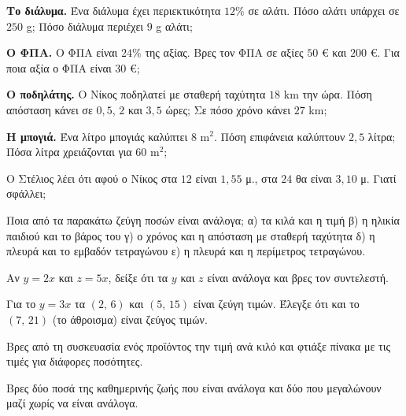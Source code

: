 \ex \textbf{Το διάλυμα.} Ένα διάλυμα έχει περιεκτικότητα $12\%$ σε αλάτι. Πόσο αλάτι υπάρχει σε $250$ g; Πόσο διάλυμα περιέχει $9$ g αλάτι;

\ex \textbf{Ο ΦΠΑ.} Ο ΦΠΑ είναι $24\%$ της αξίας. Βρες τον ΦΠΑ σε αξίες $50$ € και $200$ €. Για ποια αξία ο ΦΠΑ είναι $30$ €;

\ex \textbf{Ο ποδηλάτης.} Ο Νίκος ποδηλατεί με σταθερή ταχύτητα $18$ km την ώρα. Πόση απόσταση κάνει σε $0{,}5$, $2$ και $3{,}5$ ώρες; Σε πόσο χρόνο κάνει $27$ km;

\ex \textbf{Η μπογιά.} Ένα λίτρο μπογιάς καλύπτει $8$ m$^2$. Πόση επιφάνεια καλύπτουν $2{,}5$ λίτρα; Πόσα λίτρα χρειάζονται για $60$ m$^2$;


\ex Ο Στέλιος λέει ότι αφού ο Νίκος στα $12$ είναι $1{,}55$ μ., στα $24$ θα είναι $3{,}10$ μ. Γιατί σφάλλει;

\ex Ποια από τα παρακάτω ζεύγη ποσών είναι ανάλογα; α) τα κιλά και η τιμή \quad β) η ηλικία παιδιού και το βάρος του \quad γ) ο χρόνος και η απόσταση με σταθερή ταχύτητα \quad δ) η πλευρά και το εμβαδόν τετραγώνου \quad ε) η πλευρά και η περίμετρος τετραγώνου.

\ex Αν $y=2x$ και $z=5x$, δείξε ότι τα $y$ και $z$ είναι ανάλογα και βρες τον συντελεστή.

\ex Για το $y=3x$ τα $(2,\,6)$ και $(5,\,15)$ είναι ζεύγη τιμών. Έλεγξε ότι και το $(7,\,21)$ (το άθροισμα) είναι ζεύγος τιμών.


\ex Βρες από τη συσκευασία ενός προϊόντος την τιμή ανά κιλό και φτιάξε πίνακα με τις τιμές για διάφορες ποσότητες.

\ex Βρες δύο ποσά της καθημερινής ζωής που είναι ανάλογα και δύο που μεγαλώνουν μαζί χωρίς να είναι ανάλογα.
